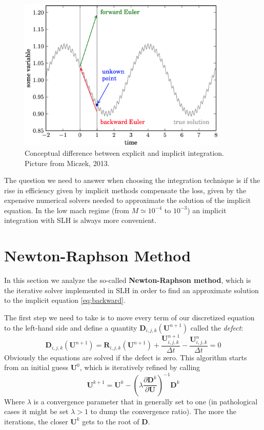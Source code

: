 \begin{figure}[t]
\centering
\includegraphics[width=10cm]{./img/implicit}
\caption{Conceptual difference between explicit and implicit integration. Picture from Miczek, 2013.}
\label{fig:implicit}
\centering
\end{figure}
The question we need to answer when choosing the integration technique is if the rise in efficiency given by implicit methods compensate the loss, given by the expensive numerical solvers needed to approximate the solution of the implicit equation. In the low mach regime (from $M \simeq 10^{-4}$ to $10^{-3}$) an implicit integration with SLH is always more convenient. 

\section{Newton-Raphson Method}
In this section we analyze the so-called \textbf{Newton-Raphson method}, which is the iterative solver implemented in SLH in order to find an approximate solution to the implicit equation \ref{eq:backward}. 

The first step we need to take is to move every term of our discretized equation to the left-hand side and define a quantity $\mathbf{D}_{i, j, k}(\mathbf{U}^{n+1})$ called the \textit{defect}:
\begin{equation}\label{eq:defect}
	\mathbf{D}_{i, j, k}(\mathbf{U}^{n+1}) = \mathbf{R}_{i, j, k}(\mathbf{U}^{n+1}) + \frac{\mathbf{U}_{i, j, k}^{n+1}}{\Delta t} - \frac{\mathbf{U}^n_{i, j, k}}{\Delta t} = 0
\end{equation}
Obviously the equations are solved if the defect is zero. This algorithm starts from an initial guess $\mathbf{U}^0$, which is iteratively refined by calling
\begin{equation}\label{eq:newtonraphson}
	\mathbf{U}^{k+1} = \mathbf{U}^k - \left( \lambda \frac{\partial \mathbf{D}^k}{\partial \mathbf{U}}  \right)^{-1} \mathbf{D}^k
\end{equation}
Where $\lambda$ is a convergence parameter that in generally set to one (in pathological cases it might be set $\lambda > 1$ to dump the convergence ratio). The more the iterations, the closer $\mathbf{U}^k$ gets to the root of $\mathbf{D}$.

